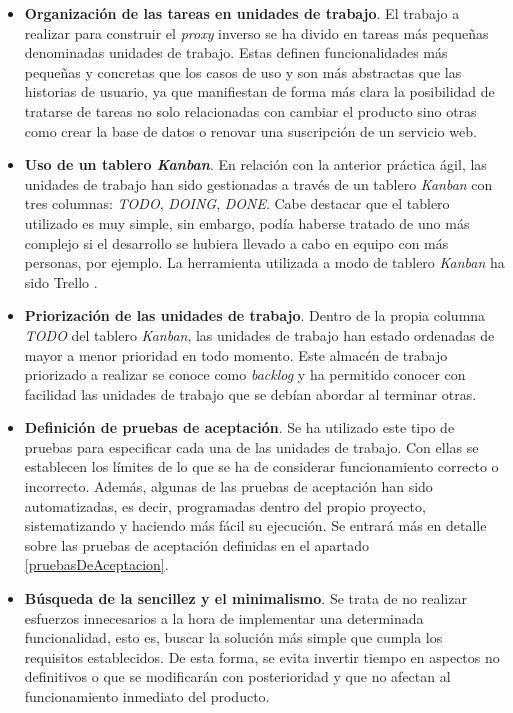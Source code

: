 \documentclass[11pt,spanish,listoffigures]{tfgetsinf}
\begin{document}
\begin{itemize}

	\item \textbf{Organización de las tareas en unidades de trabajo}. El trabajo a realizar para construir el \emph{proxy} inverso se ha divido en tareas más pequeñas denominadas unidades de trabajo. Estas definen funcionalidades más pequeñas y concretas que los casos de uso y son más abstractas que las historias de usuario, ya que manifiestan de forma más clara la posibilidad de tratarse de tareas no solo relacionadas con cambiar el producto sino otras como crear la base de datos o renovar una suscripción de un servicio web.

	\item \textbf{Uso de un tablero \emph{Kanban}}. En relación con la anterior práctica ágil, las unidades de trabajo han sido gestionadas a través de un tablero \emph{Kanban} con tres columnas: \emph{TODO}, \emph{DOING}, \emph{DONE}. Cabe destacar que el tablero utilizado es muy simple, sin embargo, podía haberse tratado de uno más complejo si el desarrollo se hubiera llevado a cabo en equipo con más personas, por ejemplo. La herramienta utilizada a modo de tablero \emph{Kanban} ha sido Trello \cite{Trello}.


	\item \textbf{Priorización de las unidades de trabajo}. Dentro de la propia columna \emph{TODO} del tablero \emph{Kanban}, las unidades de trabajo han estado ordenadas de mayor a menor prioridad en todo momento. Este almacén de trabajo priorizado a realizar se conoce como \emph{backlog} y ha permitido conocer con facilidad las unidades de trabajo que se debían abordar al terminar otras.

	\item \textbf{Definición de pruebas de aceptación}. Se ha utilizado este tipo de pruebas para especificar cada una de las unidades de trabajo. Con ellas se establecen los límites de lo que se ha de considerar funcionamiento correcto o incorrecto. Además, algunas de las pruebas de aceptación han sido automatizadas, es decir, programadas dentro del propio proyecto, sistematizando y haciendo más fácil su ejecución. Se entrará más en detalle sobre las pruebas de aceptación definidas en el apartado \ref{pruebasDeAceptacion}.

	\item \textbf{Búsqueda de la sencillez y el minimalismo}. Se trata de no realizar esfuerzos innecesarios a la hora de implementar una determinada funcionalidad, esto es, buscar la solución más simple que cumpla los requisitos establecidos. De esta forma, se evita invertir tiempo en aspectos no definitivos o que se modificarán con posterioridad y que no afectan al funcionamiento inmediato del producto.


\end{itemize}
\end{document}
